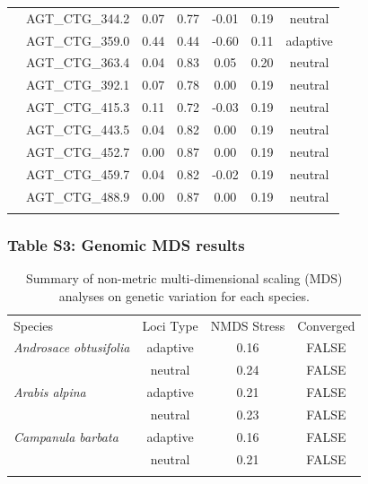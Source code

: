 \documentclass[11pt,]{article}
\begin{document}
\begin{longtable}[c]{@{}lcccccc@{}}
\\\addlinespace
& AGT\_CTG\_344.2 & 0.07 & 0.77 & -0.01 & 0.19 & neutral
\\\addlinespace
& AGT\_CTG\_359.0 & 0.44 & 0.44 & -0.60 & 0.11 & adaptive
\\\addlinespace
& AGT\_CTG\_363.4 & 0.04 & 0.83 & 0.05 & 0.20 & neutral
\\\addlinespace
& AGT\_CTG\_392.1 & 0.07 & 0.78 & 0.00 & 0.19 & neutral
\\\addlinespace
& AGT\_CTG\_415.3 & 0.11 & 0.72 & -0.03 & 0.19 & neutral
\\\addlinespace
& AGT\_CTG\_443.5 & 0.04 & 0.82 & 0.00 & 0.19 & neutral
\\\addlinespace
& AGT\_CTG\_452.7 & 0.00 & 0.87 & 0.00 & 0.19 & neutral
\\\addlinespace
& AGT\_CTG\_459.7 & 0.04 & 0.82 & -0.02 & 0.19 & neutral
\\\addlinespace
& AGT\_CTG\_488.9 & 0.00 & 0.87 & 0.00 & 0.19 & neutral
\\\addlinespace
\bottomrule
\end{longtable}

\subsubsection{Table S3: Genomic MDS
results}\label{table-s3-genomic-mds-results}

\begin{longtable}[c]{@{}lccc@{}}
\toprule\addlinespace
Species & Loci Type & NMDS Stress & Converged
\\\addlinespace
\midrule\endhead
\textit{Androsace obtusifolia} & adaptive & 0.16 & FALSE
\\\addlinespace
& neutral & 0.24 & FALSE
\\\addlinespace
\textit{Arabis alpina} & adaptive & 0.21 & FALSE
\\\addlinespace
& neutral & 0.23 & FALSE
\\\addlinespace
\textit{Campanula barbata} & adaptive & 0.16 & FALSE
\\\addlinespace
& neutral & 0.21 & FALSE
\\\addlinespace
\bottomrule
\addlinespace
\caption{Summary of non-metric multi-dimensional scaling (MDS) analyses
on genetic variation for each species.}
\end{longtable}
\end{document}
